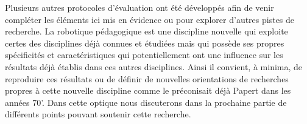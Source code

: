 \begin{concluPart}
Plusieurs autres protocoles d'évaluation ont été développés afin de venir compléter les éléments ici mis en évidence ou pour explorer d'autres pistes de recherche.
La robotique pédagogique est une discipline nouvelle qui exploite certes des disciplines déjà connues et étudiées mais qui possède ses propres spécificités et caractéristiques qui potentiellement ont une influence sur les résultats déjà établis dans ces autres disciplines. Ainsi il convient, à minima, de reproduire ces résultats ou de définir de nouvelles orientations de recherches propres à cette nouvelle discipline comme le préconisait déjà Papert dans les années 70'. Dans cette optique nous discuterons dans la prochaine partie de différents points pouvant soutenir cette recherche.
\end{concluPart}